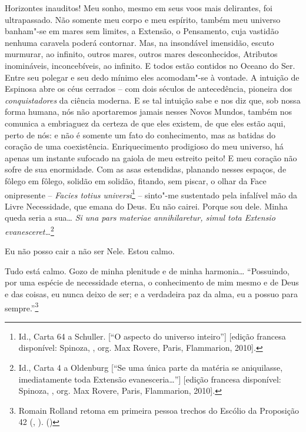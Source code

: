 Horizontes inauditos! Meu sonho, mesmo em seus voos mais delirantes, foi
ultrapassado. Não somente meu corpo e meu espírito, também meu universo
banham"-se em mares sem limites, a Extensão, o Pensamento, cuja vastidão
nenhuma caravela poderá contornar. Mas, na insondável imensidão, escuto
murmurar, ao infinito, outros mares, outros mares desconhecidos,
Atributos inomináveis, inconcebíveis, ao infinito. E todos estão
contidos no Oceano do Ser. Entre seu polegar e seu dedo mínimo eles
acomodam"-se à vontade. A intuição de Espinosa abre os céus cerrados --
com dois séculos de antecedência, pioneira dos \emph{conquistadores} da
ciência moderna. E se tal intuição sabe e nos diz que, sob nossa forma
humana, nós não aportaremos jamais nesses Novos Mundos, também nos
comunica a embriaguez da certeza de que eles existem, de que eles estão
aqui, perto de nós: e não é somente um fato do conhecimento, mas as
batidas do coração de uma coexistência. Enriquecimento prodigioso do meu
universo, há apenas um instante sufocado na gaiola de meu estreito
peito! E meu coração não sofre de sua enormidade. Com as asas
estendidas, planando nesses espaços, de fôlego em fôlego, solidão em
solidão, fitando, sem piscar, o olhar da Face onipresente --
\emph{Facies totius universi}\footnote{Id., Carta 64 a Schuller. {[}``O
  aspecto do universo inteiro''{]} {[}edição francesa disponível:
  Spinoza, {}, org. Max Rovere, Paris, \scalebox{0.8}{GF} Flammarion,
  2010{]}.} -- sinto"-me sustentado pela infalível mão da Livre
Necessidade, que emana do Deus. Eu não cairei. Porque sou dele. Minha
queda seria a sua\ldots{} \emph{Si una pars materiae annihilaretur, simul
tota Extensio evanesceret\ldots{}}\footnote{Id., Carta 4 a Oldenburg {[}``Se
  uma única parte da matéria se aniquilasse, imediatamente toda Extensão
  evanesceria\ldots{}''{]} {[}edição francesa disponível: Spinoza,
  {}, org. Max Rovere, Paris, \scalebox{0.8}{GF} Flammarion, 2010{]}.}

Eu não posso cair a não ser Nele. Estou calmo.

Tudo está calmo. Gozo de minha plenitude e de minha harmonia\ldots{}
``Possuindo, por uma espécie de necessidade eterna, o conhecimento de
mim mesmo e de Deus e das coisas, eu nunca deixo de ser; e a verdadeira
paz da alma, eu a possuo para sempre.''\footnote{Romain Rolland retoma
  em primeira pessoa trechos do Escólio da Proposição 42 ({},
  \scalebox{0.8}{V}). (\scalebox{0.8}{N.~T.})}

